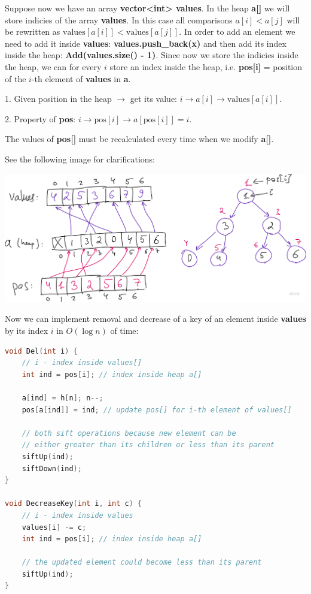 
Suppose now we have an array \textbf{vector<int> values}. In the heap \textbf{a[]} we will store indicies of the array \textbf{values}. In this case all comparisons $a[i] < a[j]$ will be rewritten as $\text{values}[a[i]] < \text{values}[a[j]]$. In order to add an element we need to add it inside \textbf{values}: \textbf{values.push\_back(x)} and then add its index inside the heap: \textbf{Add(values.size() - 1)}. Since now we store the indicies inside the heap, we can for every $i$ store an index inside the heap, i.e. \textbf{pos[i]} = position of the $i$-th element of \textbf{values} in \textbf{a}.

1. Given position in the heap $\to$ get its value: $i \to a[i] \to \text{values}[a[i]]$.

2. Property of \textbf{pos}: $i \to \text{pos}[i] \to a[\text{pos}[i]] = i$.

The values of \textbf{pos[]} must be recalculated every time when we modify \textbf{a[]}.

See the following image for clarifications:

\begin{center}
    \includegraphics[scale=0.25]{./assets/12-binary-heap/3.png}
\end{center}

Now we can implement removal and decrease of a key of an element inside \textbf{values} by its index $i$ in $O(\log{n})$ of time:

\begin{lstlisting}[language=C++]
void Del(int i) {
    // i - index inside values[]
    int ind = pos[i]; // index inside heap a[]

    a[ind] = h[n]; n--;
    pos[a[ind]] = ind; // update pos[] for i-th element of values[]

    // both sift operations because new element can be
    // either greater than its children or less than its parent
    siftUp(ind);
    siftDown(ind);
}

void DecreaseKey(int i, int c) {
    // i - index inside values
    values[i] -= c;
    int ind = pos[i]; // index inside heap a[]

    // the updated element could become less than its parent
    siftUp(ind);
}
\end{lstlisting}


